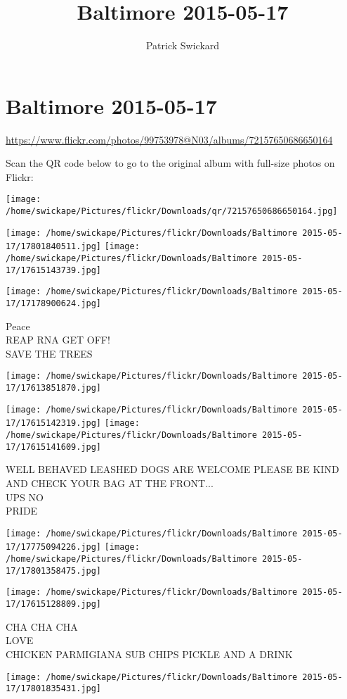 \documentclass[10pt,letterpaper]{article}
\title{Baltimore 2015-05-17}
\author{Patrick Swickard}
\date{}
\begin{document}
\section*{Baltimore 2015-05-17}

\url{https://www.flickr.com/photos/99753978@N03/albums/72157650686650164}

Scan the QR code below to go to the original album with full-size photos on Flickr:

\texttt{[image: /home/swickape/Pictures/flickr/Downloads/qr/72157650686650164.jpg]}
\pagebreak

\texttt{[image: /home/swickape/Pictures/flickr/Downloads/Baltimore 2015-05-17/17801840511.jpg]}
\texttt{[image: /home/swickape/Pictures/flickr/Downloads/Baltimore 2015-05-17/17615143739.jpg]}

\texttt{[image: /home/swickape/Pictures/flickr/Downloads/Baltimore 2015-05-17/17178900624.jpg]}

Peace\\
REAP RNA GET OFF!\\
SAVE THE TREES
\pagebreak

\texttt{[image: /home/swickape/Pictures/flickr/Downloads/Baltimore 2015-05-17/17613851870.jpg]}

\vspace{0.25in}
\texttt{[image: /home/swickape/Pictures/flickr/Downloads/Baltimore 2015-05-17/17615142319.jpg]}
\texttt{[image: /home/swickape/Pictures/flickr/Downloads/Baltimore 2015-05-17/17615141609.jpg]}

WELL BEHAVED LEASHED DOGS ARE WELCOME PLEASE BE KIND AND CHECK YOUR BAG AT THE FRONT...\\
UPS NO\\
PRIDE
\pagebreak

\texttt{[image: /home/swickape/Pictures/flickr/Downloads/Baltimore 2015-05-17/17775094226.jpg]}
\texttt{[image: /home/swickape/Pictures/flickr/Downloads/Baltimore 2015-05-17/17801358475.jpg]}

\texttt{[image: /home/swickape/Pictures/flickr/Downloads/Baltimore 2015-05-17/17615128809.jpg]}

CHA CHA CHA\\
LOVE\\
CHICKEN PARMIGIANA SUB CHIPS PICKLE AND A DRINK
\pagebreak

\texttt{[image: /home/swickape/Pictures/flickr/Downloads/Baltimore 2015-05-17/17801835431.jpg]}
\end{document}
